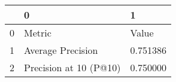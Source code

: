 \begin{tabular}{lll}
\toprule
 & 0 & 1 \\
\midrule
0 & Metric & Value \\
1 & Average Precision & 0.751386 \\
2 & Precision at 10 (P@10) & 0.750000 \\
\bottomrule
\end{tabular}
